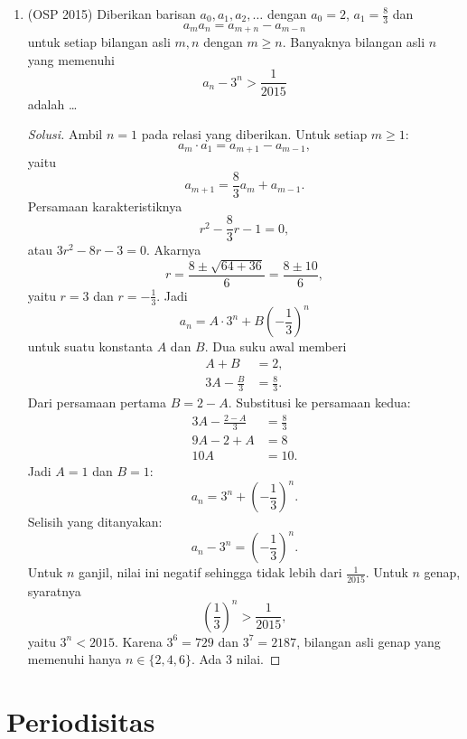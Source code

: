 \documentclass[12pt]{scrartcl}
\begin{document}
\begin{enumerate}
	\item (OSP 2015)
	Diberikan barisan $a_0, a_1, a_2, \dots$ dengan $a_0=2$, $a_1=\frac{8}{3}$ dan
	\[a_ma_n=a_{m+n}-a_{m-n}\]
	untuk setiap bilangan asli $m, n$ dengan $m \ge n$. Banyaknya bilangan asli $n$ yang memenuhi
	\[a_n-3^n>\frac{1}{2015}\]
	adalah \dots
	\begin{proof}[Solusi]
	\renewcommand{\qedsymbol}{$\blacksquare$}
	Ambil $n = 1$ pada relasi yang diberikan. Untuk setiap $m \ge 1$:
	\[ a_m \cdot a_1 = a_{m+1} - a_{m-1}, \]
	yaitu
	\[ a_{m+1} = \frac{8}{3}a_m + a_{m-1}. \]
	Persamaan karakteristiknya
	\[ r^2 - \frac{8}{3}r - 1 = 0, \]
	atau $3r^2 - 8r - 3 = 0$. Akarnya
	\[ r = \frac{8 \pm \sqrt{64 + 36}}{6} = \frac{8 \pm 10}{6}, \]
	yaitu $r = 3$ dan $r = -\frac13$. Jadi
	\[ a_n = A \cdot 3^n + B\left(-\frac{1}{3}\right)^n \]
	untuk suatu konstanta $A$ dan $B$.
	Dua suku awal memberi
	\begin{align*}
	A + B &= 2, \\
	3A - \frac{B}{3} &= \frac{8}{3}.
	\end{align*}
	Dari persamaan pertama $B = 2 - A$. Substitusi ke persamaan kedua:
	\begin{align*}
	3A - \frac{2 - A}{3} &= \frac{8}{3} \\
	9A - 2 + A &= 8 \\
	10A &= 10.
	\end{align*}
	Jadi $A = 1$ dan $B = 1$:
	\[ a_n = 3^n + \left(-\frac{1}{3}\right)^n. \]
	Selisih yang ditanyakan:
	\[ a_n - 3^n = \left(-\frac{1}{3}\right)^n. \]
	Untuk $n$ ganjil, nilai ini negatif sehingga tidak lebih dari $\frac{1}{2015}$.
	Untuk $n$ genap, syaratnya
	\[ \left(\frac{1}{3}\right)^n > \frac{1}{2015}, \]
	yaitu $3^n < 2015$. Karena $3^6 = 729$ dan $3^7 = 2187$, bilangan asli
	genap yang memenuhi hanya $n \in \{2, 4, 6\}$. Ada $3$ nilai.
	\end{proof}

\end{enumerate}

\section{Periodisitas}
\end{document}
